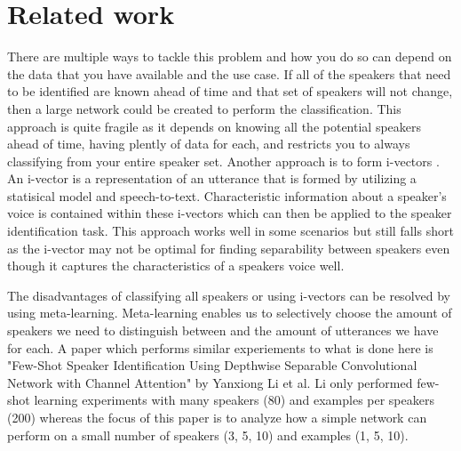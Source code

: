 \documentclass{article}
\begin{document}

\section{Related work}
There are multiple ways to tackle this problem and how you do so can depend on the data that you have available and 
the use case. If all of the speakers that need to be identified are known ahead of time and that set of speakers will 
not change, then a large network could be created to perform the classification. This approach is quite fragile as it 
depends on knowing all the potential speakers ahead of time, having plently of data for each, and restricts you to 
always classifying from your entire speaker set. Another approach is to form i-vectors \cite{ivectors}. An i-vector
is a representation of an utterance that is formed by utilizing a statisical model and speech-to-text. Characteristic 
information about a speaker's voice is contained within these i-vectors which can then be applied to the speaker 
identification task. This approach works well in some scenarios but still falls short as the i-vector may not be optimal
for finding separability between speakers even though it captures the characteristics of a speakers voice well.

The disadvantages of classifying all speakers or using i-vectors can be resolved by using meta-learning. Meta-learning
enables us to selectively choose the amount of speakers we need to distinguish between and the amount of utterances we have
for each. A paper which performs similar experiements to what is done here is "Few-Shot Speaker Identification Using Depthwise
Separable Convolutional Network with Channel Attention" \cite{FewShotSpeakerIDChannelAttention} by Yanxiong Li et al. Li
only performed few-shot learning experiments with many speakers (80) and examples per speakers (200) whereas the 
focus of this paper is to analyze how a simple network can perform on a small number of speakers (3, 5, 10) and examples (1, 5, 10).
\end{document}
